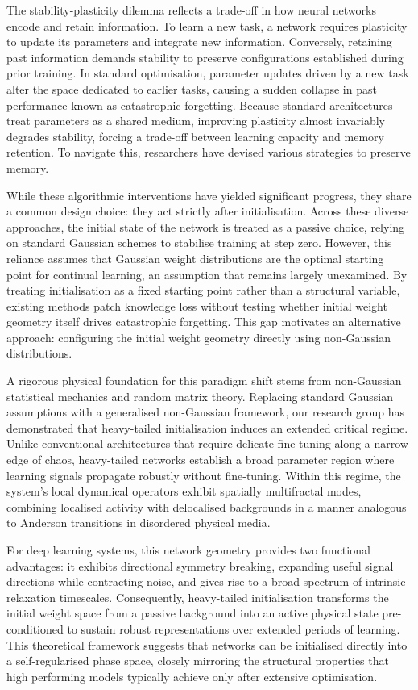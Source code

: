 \documentclass[11pt,oneside]{report}
\begin{document}
The stability-plasticity dilemma reflects a trade-off in how neural networks encode and retain information. To learn a new task, a network requires plasticity to update its parameters and integrate new information. Conversely, retaining past information demands stability to preserve configurations established during prior training. In standard optimisation, parameter updates driven by a new task alter the space dedicated to earlier tasks, causing a sudden collapse in past performance known as catastrophic forgetting. Because standard architectures treat parameters as a shared medium, improving plasticity almost invariably degrades stability, forcing a trade-off between learning capacity and memory retention. To navigate this, researchers have devised various strategies to preserve memory.

While these algorithmic interventions have yielded significant progress, they share a common design choice: they act strictly after initialisation. Across these diverse approaches, the initial state of the network is treated as a passive choice, relying on standard Gaussian schemes to stabilise training at step zero. However, this reliance assumes that Gaussian weight distributions are the optimal starting point for continual learning, an assumption that remains largely unexamined. By treating initialisation as a fixed starting point rather than a structural variable, existing methods patch knowledge loss without testing whether initial weight geometry itself drives catastrophic forgetting. This gap motivates an alternative approach: configuring the initial weight geometry directly using non-Gaussian distributions.

A rigorous physical foundation for this paradigm shift stems from non-Gaussian statistical mechanics and random matrix theory. Replacing standard Gaussian assumptions with a generalised non-Gaussian framework, our research group has demonstrated that heavy-tailed initialisation induces an extended critical regime. Unlike conventional architectures that require delicate fine-tuning along a narrow edge of chaos, heavy-tailed networks establish a broad parameter region where learning signals propagate robustly without fine-tuning. Within this regime, the system's local dynamical operators exhibit spatially multifractal modes, combining localised activity with delocalised backgrounds in a manner analogous to Anderson transitions in disordered physical media.  

For deep learning systems, this network geometry provides two functional advantages: it exhibits directional symmetry breaking, expanding useful signal directions while contracting noise, and gives rise to a broad spectrum of intrinsic relaxation timescales. Consequently, heavy-tailed initialisation transforms the initial weight space from a passive background into an active physical state pre-conditioned to sustain robust representations over extended periods of learning. This theoretical framework suggests that networks can be initialised directly into a self-regularised phase space, closely mirroring the structural properties that high performing models typically achieve only after extensive optimisation. 
\end{document}
